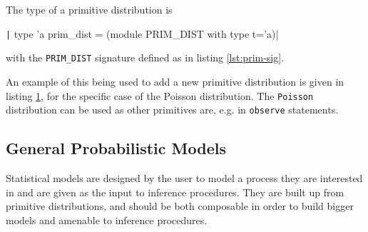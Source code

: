 The type of a primitive distribution is 
\begin{center}
																																																																														
	\texttt| type 'a prim_dist = (module PRIM_DIST with type t='a)|
\end{center}
with the \texttt{PRIM\_DIST} signature defined as in listing \ref{lst:prim-sig}.

\begin{figure}[!htb]
	\begin{minipage}{0.5\textwidth}
		\label{lst:prim-sig}
	\end{minipage}
	\begin{minipage}{0.5\textwidth}
		\label{lst:new-dist}
	\end{minipage}
\end{figure}
	
	
An example of this being used to add a new primitive distribution is given in listing \ref{lst:new-dist}, for the specific case of the Poisson distribution. The \texttt{Poisson} distribution can be used as other primitives are, e.g. in \texttt{observe} statements.
	
	
\subsection{General Probabilistic Models}
Statistical models are designed by the user to model a process they are interested in and are given as the input to inference procedures. They are built up from primitive distributions, and should be both composable in order to build bigger models and amenable to inference procedures.

